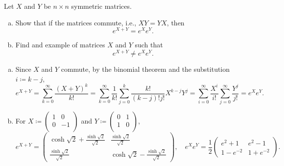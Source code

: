 \begin{problem*}[Exercise 5.4.6]\label{ex5.4.6}
	Let \(X\) and \(Y\) be \(n \times n\) symmetric matrices.
	\begin{enumerate}[(a)]
		\item\label{ex5.4.6:a} Show that if the matrices commute, i.e., \(XY = YX\), then
		      \[
			      e^{X + Y}
			      = e^X e^Y.
		      \]
		\item\label{ex5.4.6:b} Find and example of matrices \(X\) and \(Y\) such that
		      \[
			      e^{X + Y}
			      \neq e^X e^Y.
		      \]
	\end{enumerate}
\end{problem*}
\begin{answer}
	\begin{enumerate}[(a)]
		\item Since \(X\) and \(Y\) commute, by the binomial theorem and the substitution \(i \coloneqq k-j\),
		      \[
			      e^{X+Y}
			      = \sum_{k=0}^{\infty} \frac{(X+Y)^k}{k!}
			      = \sum_{k=0}^{\infty} \frac{1}{k!} \sum_{j=0}^{k} \frac{k!}{(k-j)!j!} X^{k-j}Y^{j}
			      = \sum_{i=0}^{\infty} \frac{X^i}{i!} \sum_{j=0}^{\infty} \frac{Y^j}{j!}
			      =e^{X}e^{Y}.
		      \]
		\item For \(X \coloneqq \begin{pmatrix}
			      1 & 0  \\
			      0 & -1 \\
		      \end{pmatrix}\) and \(Y\coloneqq \begin{pmatrix}
			      0 & 1 \\
			      1 & 0 \\
		      \end{pmatrix}\),
		      \[
			      e^{X+Y} = \begin{pmatrix}
				      \cosh \sqrt{2} + \frac{\sinh \sqrt{2}}{\sqrt{2} } & \frac{\sinh \sqrt{2}}{\sqrt{2} }                  \\
				      \frac{\sinh \sqrt{2}}{\sqrt{2} }                  & \cosh \sqrt{2} - \frac{\sinh \sqrt{2}}{\sqrt{2} }
			      \end{pmatrix},\quad
			      e^X e^Y = \frac{1}{2} \begin{pmatrix}
				      e^2 + 1    & e^2 - 1    \\
				      1 - e^{-2} & 1 + e^{-2}
			      \end{pmatrix}.
		      \]
	\end{enumerate}
\end{answer}

